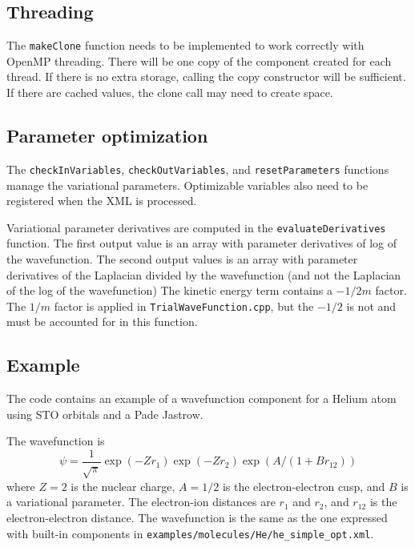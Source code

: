\subsection{Threading}
The \texttt{makeClone} function needs to be implemented to work correctly with OpenMP threading.
There will be one copy of the component created for each thread.
If there is no extra storage, calling the copy constructor will be sufficient.
If there are cached values, the clone call may need to create space.


\subsection{Parameter optimization}

The \texttt{checkInVariables}, \texttt{checkOutVariables}, and \texttt{resetParameters} functions manage the variational parameters.
Optimizable variables also need to be registered when the XML is processed.

Variational parameter derivatives are computed in the \texttt{evaluateDerivatives} function.
The first output value is an array with parameter derivatives of log of the wavefunction.
The second output values is an array with parameter derivatives of
the Laplacian divided by the wavefunction (and not the Laplacian of the log of the wavefunction)
The kinetic energy term contains a $-1/2m$ factor.
The $1/m$ factor is applied in \texttt{TrialWaveFunction.cpp}, but the $-1/2$ is not and must be accounted for in this function.




\subsection{Example}
The code contains an example of a wavefunction component for a Helium atom using STO orbitals and a Pade Jastrow.

The wavefunction is
\begin{equation}
\psi = \frac{1}{\sqrt{\pi}} \exp(-Z r_1) \exp(-Z r_2) \exp(A / (1 + B r_{12}))
\end{equation}
where $Z = 2$ is the nuclear charge, $A=1/2$ is the electron-electron cusp, and $B$ is a variational parameter.
The electron-ion distances are $r_1$ and $r_2$, and $r_{12}$ is the electron-electron distance.
The wavefunction is the same as the one expressed with built-in components in \texttt{examples/molecules/He/he\_simple\_opt.xml}.


